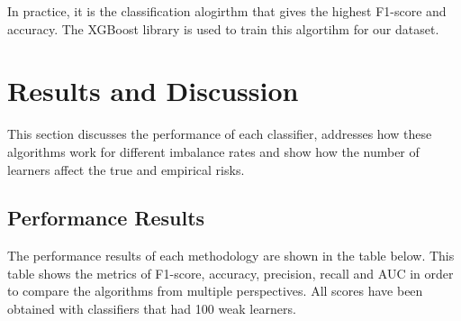 \documentclass[conference]{IEEEtran}
\begin{document}
In practice, it is the classification alogirthm that gives the highest F1-score and accuracy. The XGBoost library is used to train this algortihm for our dataset.

\section{Results and Discussion}
This section discusses the performance of each classifier, addresses how these algorithms work for different imbalance rates and show how the number of learners affect the true and empirical risks.

\subsection{Performance Results}

The performance results of each methodology are shown in the table below. This table shows the metrics of F1-score, accuracy, precision, recall and AUC in order to compare the algorithms from multiple perspectives. All scores have been obtained with classifiers that had 100 weak learners. 
\end{document}
